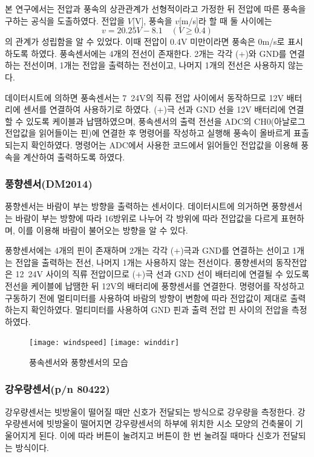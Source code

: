 본 연구에서는 전압과 풍속의 상관관계가 선형적이라고 가정한 뒤 전압에 따른 풍속을 구하는 공식을 도출하였다. 전압을 $V$[V], 풍속을 $v$[m/s]라 할 때 둘 사이에는
\[ v=20.25V-8.1\quad (V\geq 0.4)\]
의 관계가 성립함을 알 수 있었다. 이때 전압이 0.4V 미만이라면 풍속은 0m/s로 표시하도록 하였다.
풍속센서에는 4개의 전선이 존재한다. 2개는 각각 (+)와 GND를 연결하는 전선이며, 1개는 전압을 출력하는 전선이고, 나머지 1개의 전선은 사용하지 않는다. 

데이터시트에 의하면 풍속센서는 7~24V의 직류 전압 사이에서 동작하므로 12V 배터리에 센서를 연결하여 사용하기로 하였다. (+)극 선과 GND 선을 12V 배터리에 연결할 수 있도록 케이블과 납땜하였으며, 풍속센서의 출력 전선을 ADC의 CH0(아날로그 전압값을 읽어들이는 핀)에 연결한 후 명령어를 작성하고 실행해 풍속이 올바르게 표출되는지 확인하였다. 명령어는 ADC에서 사용한 코드에서 읽어들인 전압값을 이용해 풍속을 계산하여 출력하도록 하였다.

\subsubsection{풍향센서(DM2014)}
풍향센서는 바람이 부는 방향을 출력하는 센서이다. 데이터시트에 의거하면 풍향센서는 바람이 부는 방향에 따라 16방위로 나누어 각 방위에 따라 전압값을 다르게 표현하며, 이를 이용해 바람이 불어오는 방향을 알 수 있다. 

풍향센서에는 4개의 핀이 존재하며 2개는 각각 (+)극과 GND를 연결하는 선이고 1개는 전압을 출력하는 전선, 나머지 1개는 사용하지 않는 전선이다. 풍향센서의 동작전압은 12~24V 사이의 직류 전압이므로 (+)극 선과 GND 선이 배터리에 연결될 수 있도록 전선을 케이블에 납땜한 뒤 12V의 배터리에 풍향센서를 연결한다. 명령어를 작성하고 구동하기 전에 멀티미터를 사용하여 바람의 방향이 변함에 따라 전압값이 제대로 출력하는지 확인하였다. 멀티미터를 사용하여 GND 핀과 출력 전압 핀 사이의 전압을 측정하였다.

\begin{figure}[htbp]
	\centering
	\texttt{[image: windspeed]}
	\texttt{[image: winddir]}
	\caption{풍속센서와 풍향센서의 모습}
	\label{WIND}
\end{figure}

\subsubsection{강우량센서(p/n 80422)}
강우량센서는 빗방울이 떨어질 때만 신호가 전달되는 방식으로 강우량을 측정한다. 강우량센서에 빗방울이 떨어지면 강우량센서의 하부에 위치한 시소 모양의 건축물이 기울어지게 된다. 이에 따라 버튼이 눌려지고 버튼이 한 번 눌려질 때마다 신호가 전달되는 방식이다. 

